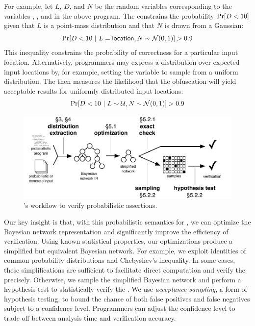 For example, let $L$,
$D$, and $N$ be the random variables corresponding to the variables
, , and  in the above program.  The
\passert constrains the probability $\Pr\!\left[D < 10\right]$ given that $L$ is
a point-mass distribution and that $N$ is drawn from a Gaussian:
%
$$ \Pr\!\left[D < 10~|~L = \mathsf{location}, N \sim \mathcal{N}(0,1)\right] > 0.9 $$
%
This inequality constrains the probability of correctness for a particular
input location.  Alternatively, programmers may express a distribution
over expected input locations by, for example, setting the
 variable to sample from a uniform distribution. The
\passert then measures the likelihood that the obfuscation will yield
acceptable results for uniformly distributed input locations:
%
$$ \Pr\!\left[D < 10~|~L \sim \mathcal{U}, N \sim \mathcal{N}(0,1)\right] > 0.9 $$

\begin{figure}
    \begin{center}
    \includegraphics[width=\columnwidth]{figs/overview.pdf}
    \end{center}
    \vspace*{-1.0ex}
    \caption{\tool's workflow to verify probabilistic
    assertions.}
    \label{fig:overview}
\end{figure}


Our key insight is that, with this probabilistic semantics for
\passerts, we can optimize the Bayesian network representation and
significantly improve the efficiency of verification.  Using known
statistical properties, our optimizations produce a simplified but
equivalent Bayesian network. For example, we exploit identities of
common probability distributions and Chebyshev's inequality.  In some
cases, these simplifications are sufficient to facilitate direct
computation and verify the \passert precisely. Otherwise, we sample
the simplified Bayesian network and perform a hypothesis test to
statistically verify the \passert. We use
\emph{acceptance sampling}, a form of hypothesis testing, to bound the
chance of both false positives and false negatives subject to a
confidence level.  Programmers can adjust the confidence level to
trade off between analysis time and verification accuracy.


